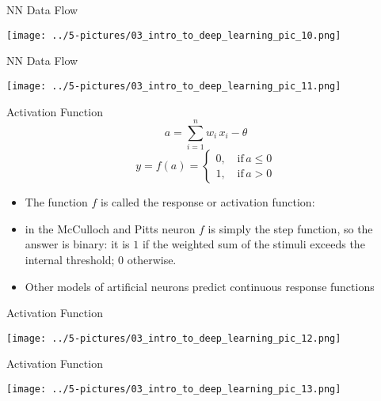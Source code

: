 \documentclass[11pt]{beamer}
\begin{document}
\begin{frame}{NN Data Flow}
	\begin{center}
	\texttt{[image: ../5-pictures/03\_intro\_to\_deep\_learning\_pic\_10.png]}
	\end{center}
\end{frame}
\begin{frame}{NN Data Flow}
	\begin{center}
	\texttt{[image: ../5-pictures/03\_intro\_to\_deep\_learning\_pic\_11.png]}
	\end{center}
\end{frame}
\begin{frame}{Activation Function}
\begin{equation} a = \sum\limits_{i=1}^n w_i \, x_i - \theta \end{equation}
\begin{equation} y = f(a) = \begin{cases} 0, \quad \text{if} \, a \le 0 \\ 1, \quad \text{if} \, a > 0\end{cases} \end{equation}
	\begin{itemize}
		\item The function $f$ is called the response or activation function:
		\item in the McCulloch and Pitts neuron $f$ is simply the step function, so the answer is binary: it is $1$ if the weighted sum of the stimuli exceeds the internal threshold; $0$ otherwise.
		\item Other models of artificial neurons predict continuous response functions
	\end{itemize}
\end{frame}
\begin{frame}{Activation Function}
	\begin{center}
	\texttt{[image: ../5-pictures/03\_intro\_to\_deep\_learning\_pic\_12.png]}
	\end{center}
\end{frame}
\begin{frame}{Activation Function}
	\begin{center}
	\texttt{[image: ../5-pictures/03\_intro\_to\_deep\_learning\_pic\_13.png]}
	\end{center}
\end{frame}
\end{document}
